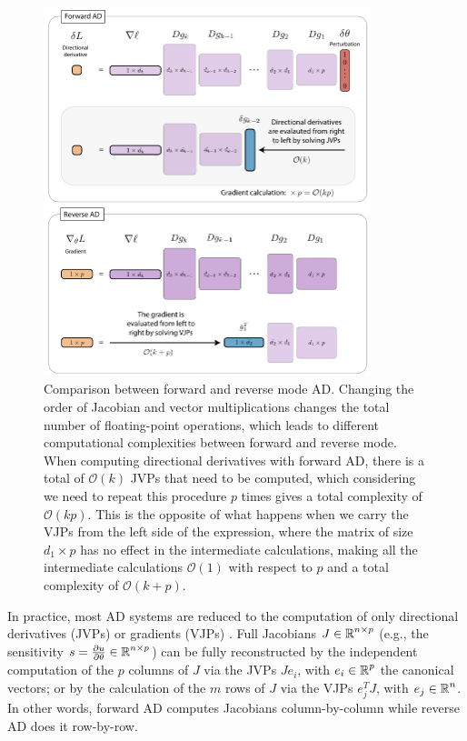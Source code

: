 \begin{figure}[p]
    \centering
    \includegraphics[width=0.85\textwidth]{figures/AD-VJPJVP.pdf}
    \caption{Comparison between forward and reverse mode AD. Changing the order of Jacobian and vector multiplications changes the total number of floating-point operations, which leads to different computational complexities between forward and reverse mode. When computing directional derivatives with forward AD, there is a total of $\mathcal O (k)$ JVPs that need to be computed, which considering we need to repeat this procedure $p$ times gives a total complexity of $\mathcal O (kp)$. This is the opposite of what happens when we carry the VJPs from the left side of the expression, where the matrix of size $d_1 \times p$ has no effect in the intermediate calculations, making all the intermediate calculations $\mathcal O (1)$ with respect to $p$ and a total complexity of $\mathcal O (k + p)$. }
    \label{fig:vjp-jvp}
\end{figure}

In practice, most AD systems are reduced to the computation of only directional derivatives (JVPs) or gradients (VJPs) \cite{Griewank:2008kh}.
Full Jacobians $J \in \operatorname{\mathbb{R}}^{n \times p}$ (e.g., the sensitivity $s = \frac{\partial u}{\partial \theta} \in \operatorname{\mathbb{R}}^{n \times p}$) can be fully reconstructed by the independent computation of the $p$ columns of $J$ via the JVPs $J e_i$, with $e_i \in \operatorname{\mathbb{R}}^p$ the canonical vectors; or by the calculation of the $m$ rows of $J$ via the VJPs $e_j^T J$, with $e_j \in \operatorname{\mathbb{R}}^n$.
In other words, forward AD computes Jacobians column-by-column while reverse AD does it row-by-row.  

